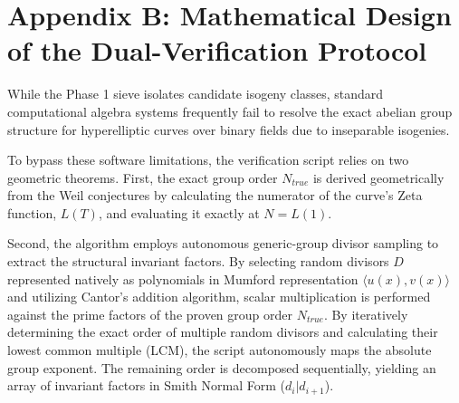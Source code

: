 \documentclass[12pt]{article}
\begin{document}
\section*{Appendix B: Mathematical Design of the Dual-Verification Protocol}
While the Phase 1 sieve isolates candidate isogeny classes, standard computational algebra systems frequently fail to resolve the exact abelian group structure for hyperelliptic curves over binary fields due to inseparable isogenies. 

To bypass these software limitations, the verification script relies on two geometric theorems. First, the exact group order $N_{true}$ is derived geometrically from the Weil conjectures by calculating the numerator of the curve's Zeta function, $L(T)$, and evaluating it exactly at $N = L(1)$. 

Second, the algorithm employs autonomous generic-group divisor sampling to extract the structural invariant factors. By selecting random divisors $D$ represented natively as polynomials in Mumford representation $\langle u(x), v(x) \rangle$ and utilizing Cantor's addition algorithm, scalar multiplication is performed against the prime factors of the proven group order $N_{true}$. By iteratively determining the exact order of multiple random divisors and calculating their lowest common multiple (LCM), the script autonomously maps the absolute group exponent. The remaining order is decomposed sequentially, yielding an array of invariant factors in Smith Normal Form ($d_i | d_{i+1}$).
\end{document}
